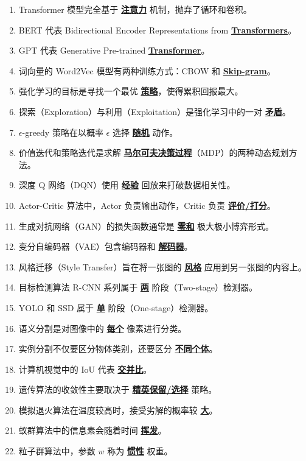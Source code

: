 \documentclass[12pt,a4paper,openany]{ctexbook}
\begin{document}
\begin{enumerate}[resume,leftmargin=2em,itemsep=1pt]
\item Transformer 模型完全基于 \underline{\textbf{注意力}} 机制，抛弃了循环和卷积。
\item BERT 代表 Bidirectional Encoder Representations from \underline{\textbf{Transformers}}。
\item GPT 代表 Generative Pre-trained \underline{\textbf{Transformer}}。
\item 词向量的 Word2Vec 模型有两种训练方式：CBOW 和 \underline{\textbf{Skip-gram}}。
\item 强化学习的目标是寻找一个最优 \underline{\textbf{策略}}，使得累积回报最大。
\item 探索（Exploration）与利用（Exploitation）是强化学习中的一对 \underline{\textbf{矛盾}}。
\item $\epsilon$-greedy 策略在以概率 $\epsilon$ 选择 \underline{\textbf{随机}} 动作。
\item 价值迭代和策略迭代是求解 \underline{\textbf{马尔可夫决策过程}}（MDP）的两种动态规划方法。
\item 深度 Q 网络（DQN）使用 \underline{\textbf{经验}} 回放来打破数据相关性。
\item Actor-Critic 算法中，Actor 负责输出动作，Critic 负责 \underline{\textbf{评价/打分}}。
\item 生成对抗网络（GAN）的损失函数通常是 \underline{\textbf{零和}} 极大极小博弈形式。
\item 变分自编码器（VAE）包含编码器和 \underline{\textbf{解码器}}。
\item 风格迁移（Style Transfer）旨在将一张图的 \underline{\textbf{风格}} 应用到另一张图的内容上。
\item 目标检测算法 R-CNN 系列属于 \underline{\textbf{两}} 阶段（Two-stage）检测器。
\item YOLO 和 SSD 属于 \underline{\textbf{单}} 阶段（One-stage）检测器。
\item 语义分割是对图像中的 \underline{\textbf{每个}} 像素进行分类。
\item 实例分割不仅要区分物体类别，还要区分 \underline{\textbf{不同个体}}。
\item 计算机视觉中的 IoU 代表 \underline{\textbf{交并比}}。
\item 遗传算法的收敛性主要取决于 \underline{\textbf{精英保留/选择}} 策略。
\item 模拟退火算法在温度较高时，接受劣解的概率较 \underline{\textbf{大}}。
\item 蚁群算法中的信息素会随着时间 \underline{\textbf{挥发}}。
\item 粒子群算法中，参数 $w$ 称为 \underline{\textbf{惯性}} 权重。

\end{enumerate}
\end{document}
